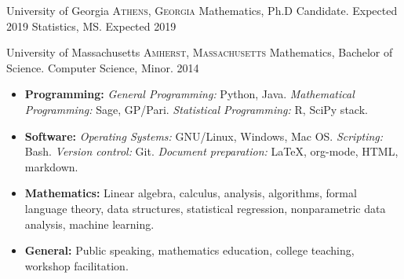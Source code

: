 \documentclass[10pt,a4paper]{article}
\begin{document}

\headedsection
  {University of Georgia}
  {\textsc{Athens, Georgia}} {%
  \headedsubsection
    {Mathematics, Ph.D Candidate.}
    {Expected 2019}
    {}
    \headedsubsection
    {Statistics, MS.}
    {Expected 2019}
    {}
}

\headedsection
  {University of Massachusetts}
  {\textsc{Amherst, Massachusetts}} {%
  \headedsubsection
    {Mathematics, Bachelor of Science. Computer Science, Minor.}
    {2014}
    {}
}

\spacedhrule{0.5em}{-0.4em}


\begin{itemize}
  \item \textbf{Programming:} \textit{General Programming:} Python, Java. \textit{Mathematical Programming:} Sage, GP/Pari. \textit{Statistical Programming:} R, SciPy stack.
  \item \textbf{Software:} \textit{Operating Systems:} GNU/Linux, Windows, Mac OS. \textit{Scripting:} Bash. \textit{Version control:} Git. \textit{Document preparation:} \LaTeX, org-mode, HTML, markdown.
   \item \textbf{Mathematics:} Linear algebra, calculus, analysis, algorithms, formal language theory, data structures, statistical regression, nonparametric data analysis, machine learning.
   \item \textbf{General:} Public speaking, mathematics education, college teaching, workshop facilitation.
\end{itemize}


\spacedhrule{0.5em}{-0.4em}
\end{document}
